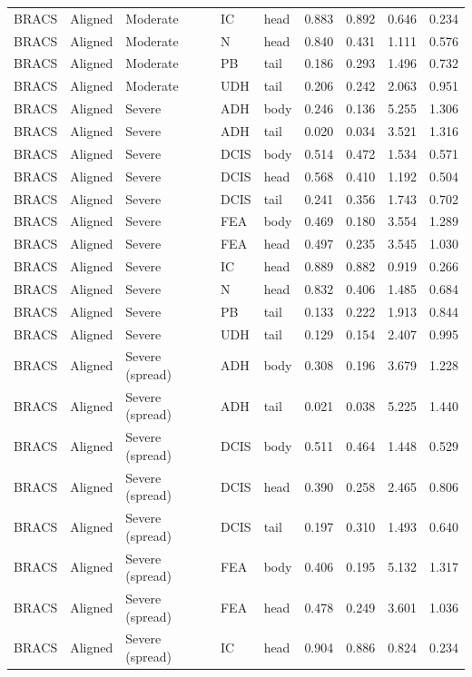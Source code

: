 \begin{longtable}{lllllrrrr}
BRACS & Aligned & Moderate & IC & head & 0.883 & 0.892 & 0.646 & 0.234 \\
BRACS & Aligned & Moderate & N & head & 0.840 & 0.431 & 1.111 & 0.576 \\
BRACS & Aligned & Moderate & PB & tail & 0.186 & 0.293 & 1.496 & 0.732 \\
BRACS & Aligned & Moderate & UDH & tail & 0.206 & 0.242 & 2.063 & 0.951 \\
BRACS & Aligned & Severe & ADH & body & 0.246 & 0.136 & 5.255 & 1.306 \\
BRACS & Aligned & Severe & ADH & tail & 0.020 & 0.034 & 3.521 & 1.316 \\
BRACS & Aligned & Severe & DCIS & body & 0.514 & 0.472 & 1.534 & 0.571 \\
BRACS & Aligned & Severe & DCIS & head & 0.568 & 0.410 & 1.192 & 0.504 \\
BRACS & Aligned & Severe & DCIS & tail & 0.241 & 0.356 & 1.743 & 0.702 \\
BRACS & Aligned & Severe & FEA & body & 0.469 & 0.180 & 3.554 & 1.289 \\
BRACS & Aligned & Severe & FEA & head & 0.497 & 0.235 & 3.545 & 1.030 \\
BRACS & Aligned & Severe & IC & head & 0.889 & 0.882 & 0.919 & 0.266 \\
BRACS & Aligned & Severe & N & head & 0.832 & 0.406 & 1.485 & 0.684 \\
BRACS & Aligned & Severe & PB & tail & 0.133 & 0.222 & 1.913 & 0.844 \\
BRACS & Aligned & Severe & UDH & tail & 0.129 & 0.154 & 2.407 & 0.995 \\
BRACS & Aligned & Severe (spread) & ADH & body & 0.308 & 0.196 & 3.679 & 1.228 \\
BRACS & Aligned & Severe (spread) & ADH & tail & 0.021 & 0.038 & 5.225 & 1.440 \\
BRACS & Aligned & Severe (spread) & DCIS & body & 0.511 & 0.464 & 1.448 & 0.529 \\
BRACS & Aligned & Severe (spread) & DCIS & head & 0.390 & 0.258 & 2.465 & 0.806 \\
BRACS & Aligned & Severe (spread) & DCIS & tail & 0.197 & 0.310 & 1.493 & 0.640 \\
BRACS & Aligned & Severe (spread) & FEA & body & 0.406 & 0.195 & 5.132 & 1.317 \\
BRACS & Aligned & Severe (spread) & FEA & head & 0.478 & 0.249 & 3.601 & 1.036 \\
BRACS & Aligned & Severe (spread) & IC & head & 0.904 & 0.886 & 0.824 & 0.234 \\

\end{longtable}
